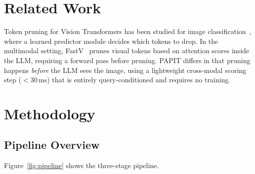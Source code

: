 \documentclass[10pt,twocolumn,letterpaper]{article}
\begin{document}
\section{Related Work}

Token pruning for Vision Transformers has been studied for image
classification~\cite{rao2021dynamicvit, meng2022adavit}, where a learned
predictor module decides which tokens to drop.
In the multimodal setting, FastV~\cite{chen2024fastv} prunes visual tokens
based on attention scores inside the LLM, requiring a forward pass before
pruning.
PAPIT differs in that pruning happens \emph{before} the LLM sees the image,
using a lightweight cross-modal scoring step ($<$30\,ms) that is entirely
query-conditioned and requires no training.

\section{Methodology}
\label{sec:method}

\subsection{Pipeline Overview}

Figure~\ref{fig:pipeline} shows the three-stage pipeline.
\end{document}
